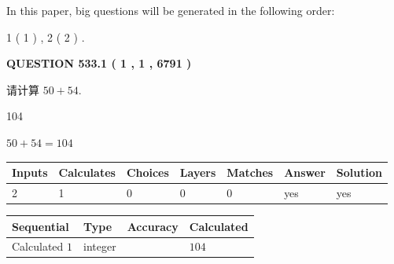 \documentclass{ctexart}
\begin{document}
   
   
\vspace{0.2in}
   
In this paper, big questions will be generated in the following order: 
   
   
   1 ( 1 )
 ,
   2 ( 2 )
 .
  
\vspace{0.2in}
  
{\textbf{\Large{QUESTION
533.1 
 ( 1 , 1 , 6791 )
}}}
  
  
 
请计算 $ %
50 +  %
54 $.
 
 
 
\noindent{}
 
 

104
 
 
\noindent{}
 
 

 
 
 
\noindent{}
 
 

$ %
50 +  %
54=   %
104$
 
 
\noindent{}
 
 

 
   
   
   
   
\noindent\begin{tabular}{|l|l|l|l|l|l|l|}
 \hline
Inputs & Calculates & Choices & Layers & Matches & Answer & Solution \\ \hline
 2  & 
 1  & 
 0
  & 
 0  & 
 0  & 
  yes & 
  yes 
  \\ \hline
 \end{tabular}
   
   
   
   
\noindent{}
   
   
  
  
\noindent\begin{tabular}{|l|l|l|l|}
\hline
 Sequential & Type & Accuracy & Calculated \\ 
\hline
 
 
  Calculated $  1 $ & integer &  & 
  $ 104 $ 
 \\  \hline  
 \end{tabular}
   
\end{document}
